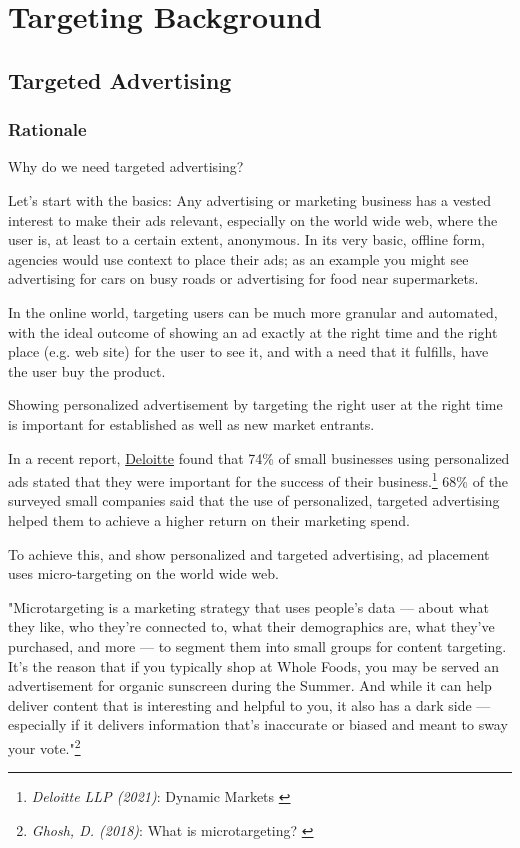 %
%

\pagebreak
\section{Targeting Background}

\onehalfspacing

\subsection{Targeted Advertising}

\subsubsection{Rationale}

Why do we need targeted advertising?

Let's start with the basics: Any advertising or marketing business has a vested interest to make their ads relevant, especially on the world wide web, where the user is, at least to a certain extent, anonymous. In its very basic, offline form, agencies would use context to place their ads; as an example you might see advertising for cars on busy roads or advertising for food near supermarkets.

In the online world, targeting users can be much more granular and automated, with the ideal outcome of showing an ad exactly at the right time and the right place (e.g. web site) for the user to see it, and with a need that it fulfills, have the user buy the product.

Showing personalized advertisement by targeting the right user at the right time is important for established as well as new market entrants.

In a recent report, \href{https://www2.deloitte.com/de/de.html}{Deloitte} found that 74\% of small businesses using personalized ads stated that they were important for the success of their business.\footnote{\textit{Deloitte LLP (2021)}: Dynamic Markets \cite{deloitteSmb}} 68\% of the surveyed small companies said that the use of personalized, targeted advertising helped them to achieve a higher return on their marketing spend.

To achieve this, and show personalized and targeted advertising, ad placement uses micro-targeting on the world wide web.

"Microtargeting is a marketing strategy that uses people’s data — about what they like, who they’re connected to, what their demographics are, what they’ve purchased, and more — to segment them into small groups for content targeting. It’s the reason that if you typically shop at Whole Foods, you may be served an advertisement for organic sunscreen during the Summer. And while it can help deliver content that is interesting and helpful to you, it also has a dark side — especially if it delivers information that’s inaccurate or biased and meant to sway your vote."\footnote{\textit{Ghosh, D. (2018)}: What is microtargeting? \cite{mozillaBlog}}

